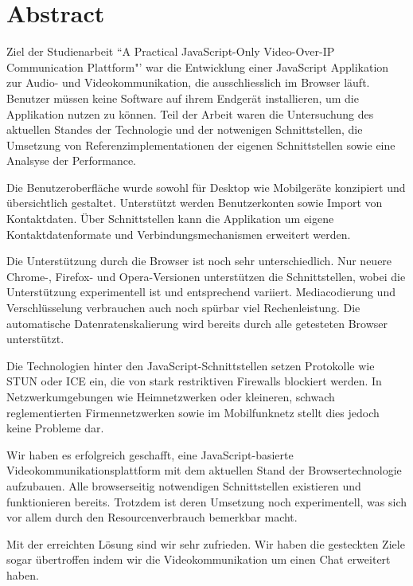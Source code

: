 \chapter{Abstract}

Ziel der Studienarbeit ``A Practical JavaScript-Only Video-Over-IP Communication Plattform"' war die Entwicklung einer JavaScript Applikation zur Audio- und Videokommunikation, die ausschliesslich im Browser läuft. Benutzer müssen keine Software auf ihrem Endgerät installieren, um die Applikation nutzen zu können. 
Teil der Arbeit waren die Untersuchung des aktuellen Standes der Technologie und der notwenigen Schnittstellen, die Umsetzung von Referenzimplementationen der eigenen Schnittstellen sowie eine Analsyse der Performance.

Die Benutzeroberfläche wurde sowohl für Desktop wie Mobilgeräte konzipiert und übersichtlich gestaltet. Unterstützt werden Benutzerkonten sowie Import von Kontaktdaten.
Über Schnittstellen kann die Applikation um eigene Kontaktdatenformate und Verbindungsmechanismen erweitert werden.

Die Unterstützung durch die Browser ist noch sehr unterschiedlich. Nur neuere Chrome-, Firefox- und Opera-Versionen unterstützen die Schnittstellen, wobei die Unterstützung experimentell ist und entsprechend variiert. Mediacodierung und Verschlüsselung verbrauchen auch noch spürbar viel Rechenleistung. Die automatische Datenratenskalierung wird bereits durch alle getesteten Browser unterstützt.

Die Technologien hinter den JavaScript-Schnittstellen setzen Protokolle wie STUN oder ICE ein, die von stark restriktiven Firewalls blockiert werden. In Netzwerkumgebungen wie Heimnetzwerken oder kleineren, schwach reglementierten Firmennetzwerken sowie im Mobilfunknetz stellt dies jedoch keine Probleme dar. 

Wir haben es erfolgreich geschafft, eine JavaScript-basierte Videokommunikationsplattform mit dem aktuellen Stand der Browsertechnologie aufzubauen. Alle browserseitig notwendigen Schnittstellen existieren und funktionieren bereits. Trotzdem ist deren Umsetzung noch experimentell, was sich vor allem durch den Resourcenverbrauch bemerkbar macht.

Mit der erreichten Lösung sind wir sehr zufrieden. Wir haben die gesteckten Ziele sogar übertroffen indem wir die Videokommunikation um einen Chat erweitert haben.